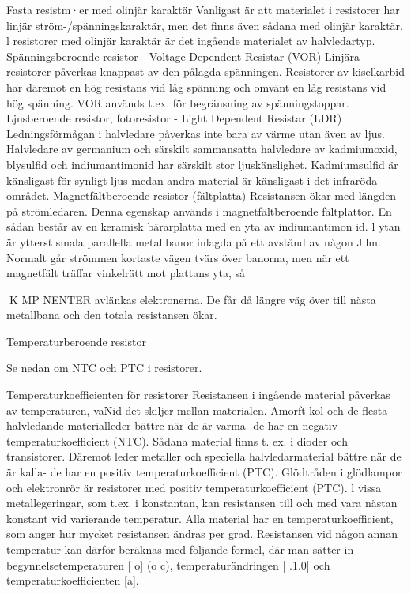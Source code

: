 \documentclass[a4paper,twoside,twocolumn,openright]{book}
\begin{document}
{{Fasta resistm·er med olinjär karaktär
Vanligast är att materialet i resistorer har
linjär ström-/spänningskaraktär, men det
finns även sådana med olinjär karaktär. l
resistorer med olinjär karaktär är det ingående materialet av halvledartyp.
Spänningsberoende resistor
- Voltage Dependent Resistar (VOR)
Linjära resistorer påverkas knappast av den
pålagda spänningen. Resistorer av kiselkarbid har däremot en hög resistans vid låg
spänning och omvänt en låg resistans vid
hög spänning. VOR används t.ex. för begränsning av spänningstoppar.
Ljusberoende resistor, fotoresistor
- Light Dependent Resistar (LDR)
Ledningsförmågan i halvledare påverkas inte
bara av värme utan även av ljus. Halvledare
av germanium och särskilt sammansatta
halvledare av kadmiumoxid, blysulfid och
indiumantimonid har särskilt stor ljuskänslighet. Kadmiumsulfid är känsligast för synligt ljus medan andra material är känsligast i
det infraröda området.
Magnetfältberoende resistor (fältplatta)
Resistansen ökar med längden på strömledaren. Denna egenskap används i magnetfältberoende fältplattor. En sådan består
av en keramisk bärarplatta med en yta av
indiumantimon id. l ytan är ytterst smala parallella metallbanor inlagda på ett avstånd av
någon J.lm. Normalt går strömmen kortaste
vägen tvärs över banorna, men när ett magnetfält träffar vinkelrätt mot plattans yta, så

K MP NENTER
avlänkas elektronerna. De får då längre väg
över till nästa metallbana och den totala
resistansen ökar.

Temperaturberoende resistor

Se nedan om NTC och PTC i resistorer.

Temperaturkoefficienten för resistorer
Resistansen i ingående material påverkas
av temperaturen, vaNid det skiljer mellan
materialen.
Amorft kol och de flesta halvledande
materialleder bättre när de är varma- de har
en negativ temperaturkoefficient (NTC). Sådana material finns t. ex. i dioder och transistorer.
Däremot leder metaller och speciella
halvledarmaterial bättre när de är kalla- de
har en positiv temperaturkoefficient (PTC).
Glödtråden i glödlampor och elektronrör är
resistorer med positiv temperaturkoefficient
(PTC). l vissa metallegeringar, som t.ex. i
konstantan, kan resistansen till och med
vara nästan konstant vid varierande temperatur.
Alla material har en temperaturkoefficient,
som anger hur mycket resistansen ändras
per grad. Resistansen vid någon annan temperatur kan därför beräknas med följande
formel, där man sätter in begynnelsetemperaturen [ o] (o c), temperaturändringen [ .1.0]
och temperaturkoefficienten [a].

}}
\end{document}
